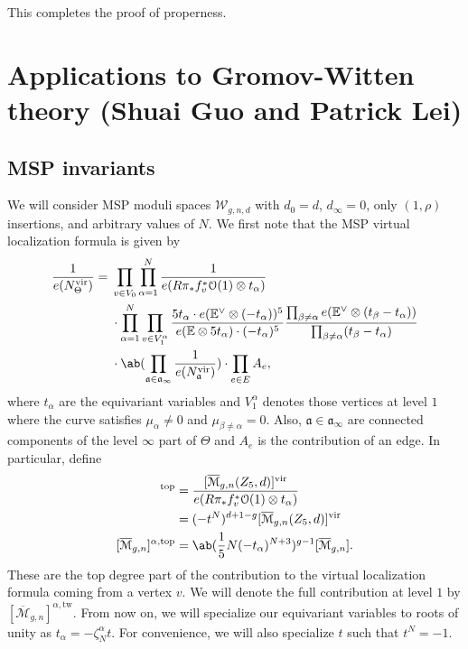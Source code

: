 \documentclass[10pt]{amsart}
\theoremstyle{definition}
\theoremstyle{remark}
\theoremstyle{plain}
\theoremstyle{definition}
\theoremstyle{remark}
\newcommand{\E}{\mathbb{E}}
\newcommand{\Mbar}{\overline{\mathcal{M}}}
\newcommand{\mc}[1]{\mathcal{#1}}
\newcommand{\mf}[1]{\mathfrak{#1}}
\newcommand{\mr}[1]{\mathrm{#1}}
\newcommand{\1}{\mathbf{1}}
\newcommand{\2}{\mathbf{2}}
\newcommand{\3}{\mathbf{3}}
\newcommand{\vir}{\mr{vir}}
\newcommand{\tw}{\mr{tw}}
\begin{document}
This completes the proof of properness.



\section{Applications to Gromov-Witten theory (Shuai Guo and Patrick Lei)}%
\label{sec:Applications to Gromov-Witten theory}

\subsection{MSP invariants}%
\label{sub:MSP invariants}

We will consider MSP moduli spaces $\mc{W}_{g,n,d}$ with $d_0 = d$, $d_{\infty} = 0$, only $(1,\rho)$ insertions, and arbitrary values of $N$. We first note that the MSP virtual localization formula is given by
\begin{align*}
    \frac{1}{e(N_{\Theta}^{\vir})} ={}& \prod_{v \in V_0} \prod_{\alpha=1}^N \frac{1}{e(R \pi_* f_v^* \mc{O}(1) \otimes t_{\alpha})} \\
    & \cdot \prod_{\alpha=1}^N \prod_{v \in V_1^{\alpha}} \frac{5 t_{\alpha} \cdot e(\E^{\vee}\otimes (-t_{\alpha}))^5}{e(\E \otimes 5 t_{\alpha})\cdot (-t_{\alpha})^5} \frac{\prod_{\beta \neq \alpha} e(\E^{\vee} \otimes (t_{\beta} - t_{\alpha}))}{\prod_{\beta \neq \alpha} (t_{\beta} - t_{\alpha})} \\
    &\cdot \ab( \prod_{\mf{a} \in \mf{a}_{\infty}} \frac{1}{e(N_{\mf{a}}^{\vir})} ) \cdot \prod_{e \in E} A_e,
\end{align*}
where $t_{\alpha}$ are the equivariant variables and $V_1^{\alpha}$ denotes those vertices at level $1$ where the curve satisfies $\mu_{\alpha} \neq 0$ and $\mu_{\beta \neq \alpha} = 0$. Also, $\mf{a} \in \mf{a}_{\infty}$ are connected components of the level $\infty$ part of $\Theta$ and $A_e$ is the contribution of an edge. In particular, define
\begin{align*}
    [\Mbar_{g,n}(Z_5,d)]^{\mr{top}} &= \frac{[\Mbar_{g,n}(Z_5,d)]^{\vir}}{e(R\pi_* f_v^* \mc{O}(1) \otimes t_{\alpha})} \\
    &= (-t^N)^{d+1-g} [\Mbar_{g,n}(Z_5,d)]^{\vir} \\
    [\Mbar_{g,n}]^{\alpha,\mr{top}} &= \ab(\frac{1}{5}N(-t_{\alpha})^{N+3})^{g-1} [\Mbar_{g,n}].
\end{align*}
These are the top degree part of the contribution to the virtual localization formula coming from a vertex $v$. We will denote the full contribution at level $1$ by $[\Mbar_{g,n}]^{\alpha,\tw}$. From now on, we will specialize our equivariant variables to roots of unity as $t_{\alpha} = -\zeta_N^{\alpha} t$. For convenience, we will also specialize $t$ such that $t^N = -1$.
\end{document}
